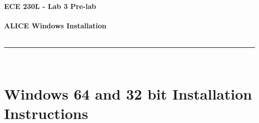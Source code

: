 \documentclass[12pt]{../manual}
\begin{document}
\begin{center}
\textbf{\huge ECE 230L - Lab 3 Pre-lab}\\~\\
\textbf{\large ALICE Windows Installation}\\~\\
\rule{6.5in}{0.5mm}\\
\end{center}

\tableofcontents

\newpage
%
\section{Windows 64 and 32 bit Installation Instructions}
\end{document}
